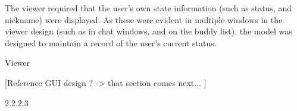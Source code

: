 The viewer required that the user’s own state information (such as status, and nickname) were displayed. As these were evident in multiple windows in the viewer design (such as in chat windows, and on the buddy list), the model was designed to maintain a record of the user’s current status. 

Viewer

[Reference GUI design ? -> that section comes next... ]


2.2.2.3 





